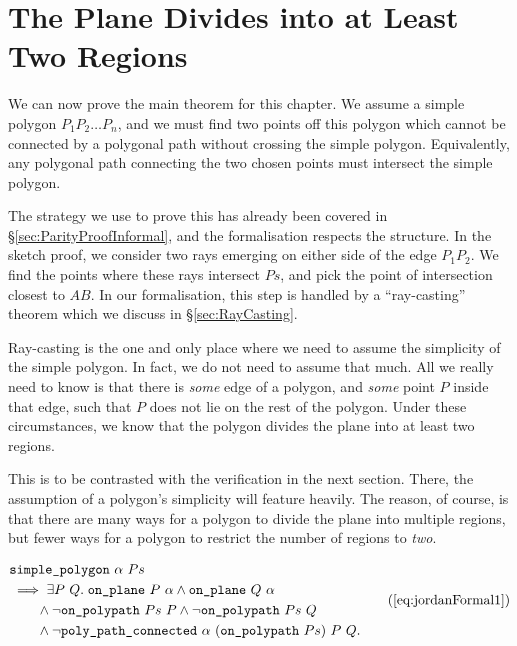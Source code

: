 \section{The Plane Divides into at Least Two Regions}\label{sec:FinalProofJordan1}
We can now prove the main theorem for this chapter. We assume a simple polygon $P_1P_2\ldots P_n$, and we must find two points off this polygon which cannot be connected by a polygonal path without crossing the simple polygon. Equivalently, any polygonal path connecting the two chosen points must intersect the simple polygon.

The strategy we use to prove this has already been covered in \S\ref{sec:ParityProofInformal}, and the formalisation respects the structure. In the sketch proof, we consider two rays emerging on either side of the edge $P_1P_2$. We find the points where these rays intersect $Ps$, and pick the point of intersection closest to $AB$. In our formalisation, this step is handled by a ``ray-casting'' theorem which we discuss in \S\ref{sec:RayCasting}. 

Ray-casting is the one and only place where we need to assume the simplicity of the simple polygon. In fact, we do not need to assume that much. All we really need to know is that there is \emph{some} edge of a polygon, and \emph{some} point $P$ inside that edge, such that $P$ does not lie on the rest of the polygon. Under these circumstances, we know that the polygon divides the plane into at least two regions.

This is to be contrasted with the verification in the next section. There, the assumption of a polygon's simplicity will feature heavily. The reason, of course, is that there are many ways for a polygon to divide the plane into multiple regions, but fewer ways for a polygon to restrict the number of regions to \emph{two}.

\begin{equation}
  \begin{split}
    &\code{simple\_polygon}\ \alpha\ Ps\\
    &\implies \exists P\ Q.\; \code{on\_plane}\ P\ \alpha \wedge \code{on\_plane}\ Q\ \alpha\\
    &\qquad\wedge \neg\code{on\_polypath}\ Ps\ P \wedge \neg\code{on\_polypath}\ Ps\ Q\\
    &\qquad\wedge \neg\code{poly\_path\_connected}\ \alpha\ (\code{on\_polypath}\ Ps)\ P\ Q.
  \end{split}\tag{\ref{eq:jordanFormal1}}
\end{equation}


